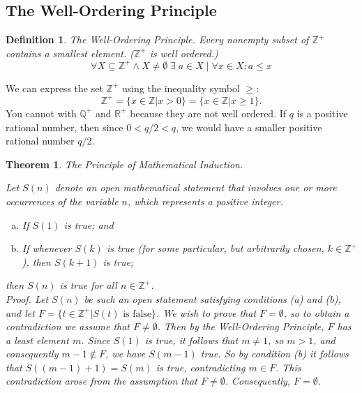 \documentclass[12pt]{article}
\newtheorem{definition}{Definition} [section]
\newtheorem{theorem}{Theorem} [section]
\begin{document}
\subsection{The Well-Ordering Principle}
\begin{definition}The Well-Ordering Principle. \emph{Every }nonempty \emph{subset of $\mathbb{Z}^+$ contains a smallest element. ($\mathbb{Z}^+$ is} well ordered.)
\[\forall X \subseteq \mathbb{Z}^+ \wedge X \neq \emptyset \; \exists \; a \in X \; |\; \forall x \in X: a \leq x\]
\end{definition}
We can express the set $\mathbb{Z}^+$ using the inequality symbol $\geq$:
\[\mathbb{Z}^+ = \{x \in \mathbb{Z} | x > 0\} = \{x \in \mathbb{Z} | x \geq 1\}.\]
You cannot with $\mathbb{Q}^+$ and $\mathbb{R}^+$ because they are not well ordered. If $q$ is a positive rational number, then since $0 < q/2 < q$, we would have a smaller positive rational number $q/2$.
\begin{theorem}The Principle of Mathematical Induction. \begin{em}Let $S(n)$ denote an open mathematical statement that involves one or more occurrences of the variable $n$, which represents a positive integer.
\begin{enumerate} [(a)]
\item If $S(1)$ is true; and
\item If whenever $S(k)$ is true (for some particular, but arbitrarily chosen, $k \in \mathbb{Z}^+$), then $S(k+1)$ is true;
\end{enumerate}
then $S(n)$ is true for all $n \in \mathbb{Z}^+$.\\
\emph{Proof.} Let $S(n)$ be such an open statement satisfying conditions (a) and (b), and let $F = \{t \in \mathbb{Z}^+ | S(t) \text{ is false}\}$. We wish to prove that $F=\emptyset$, so to obtain a contradiction we assume that $F\neq\emptyset$. Then by the Well-Ordering Principle, $F$ has a least element $m$. Since $S(1)$ is true, it follows that $m \neq 1$, so $m > 1$, and consequently $m - 1 \notin F$, we have $S(m-1)$ true. So by condition (b) it follows that $S((m-1)+1) = S(m)$ is true, contradicting $m \in F$. This contradiction arose from the assumption that $F \neq \emptyset$. Consequently, $F = \emptyset$.
\end{em}
\end{theorem}
\end{document}
